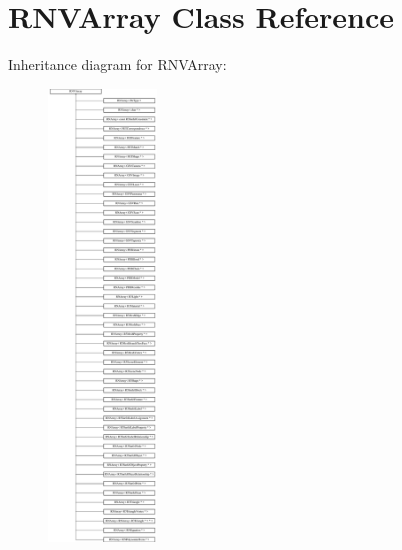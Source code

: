\hypertarget{class_r_n_v_array}{}\section{R\+N\+V\+Array Class Reference}
\label{class_r_n_v_array}
Inheritance diagram for R\+N\+V\+Array\+:\begin{figure}[H]
\begin{center}
\leavevmode
\includegraphics[height=12.000000cm]{class_r_n_v_array}
\end{center}
\end{figure}
